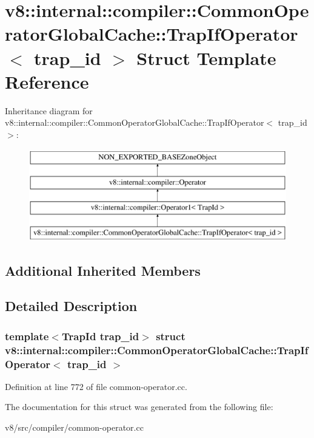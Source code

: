 \hypertarget{structv8_1_1internal_1_1compiler_1_1CommonOperatorGlobalCache_1_1TrapIfOperator}{}\section{v8\+:\+:internal\+:\+:compiler\+:\+:Common\+Operator\+Global\+Cache\+:\+:Trap\+If\+Operator$<$ trap\+\_\+id $>$ Struct Template Reference}
\label{structv8_1_1internal_1_1compiler_1_1CommonOperatorGlobalCache_1_1TrapIfOperator}
Inheritance diagram for v8\+:\+:internal\+:\+:compiler\+:\+:Common\+Operator\+Global\+Cache\+:\+:Trap\+If\+Operator$<$ trap\+\_\+id $>$\+:\begin{figure}[H]
\begin{center}
\leavevmode
\includegraphics[height=4.000000cm]{structv8_1_1internal_1_1compiler_1_1CommonOperatorGlobalCache_1_1TrapIfOperator}
\end{center}
\end{figure}
\subsection*{Additional Inherited Members}


\subsection{Detailed Description}
\subsubsection*{template$<$Trap\+Id trap\+\_\+id$>$\newline
struct v8\+::internal\+::compiler\+::\+Common\+Operator\+Global\+Cache\+::\+Trap\+If\+Operator$<$ trap\+\_\+id $>$}



Definition at line 772 of file common-\/operator.\+cc.



The documentation for this struct was generated from the following file\+:\begin{DoxyCompactItemize}
\item 
v8/src/compiler/common-\/operator.\+cc\end{DoxyCompactItemize}
